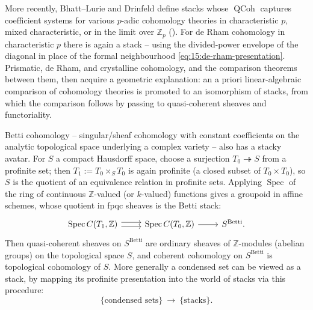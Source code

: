 \begin{remark}
\label{rmk:15:blf}
More recently, Bhatt--Lurie and Drinfeld define stacks whose $\operatorname{QCoh}$
captures coefficient systems for various $p$-adic cohomology theories in
characteristic $p$, mixed characteristic, or in the limit over $\mathbb{Z}_p$
(\cite{drinfeld2024prismatization,bhatt2022absoluteprismaticcohomology}). For de Rham
cohomology in characteristic $p$ there is again a stack -- using the divided-power
envelope of the diagonal in place of the formal neighbourhood
\eqref{eq:15:de-rham-presentation}. Prismatic, de Rham, and crystalline cohomology,
and the comparison theorems between them, then acquire a geometric explanation: an a
priori linear-algebraic comparison of cohomology theories is promoted to an
isomorphism of stacks, from which the comparison follows by passing to quasi-coherent
sheaves and functoriality.
\end{remark}

\begin{example}
\label{ex:15:betti}
Betti cohomology -- singular/sheaf cohomology with constant coefficients on the
analytic topological space underlying a complex variety -- also has a stacky
avatar. For $S$ a compact Hausdorff space, choose a surjection $T_0\twoheadrightarrow S$
from a profinite set; then $T_1 := T_0\times_S T_0$ is again profinite (a closed
subset of $T_0\times T_0$), so $S$ is the quotient of an equivalence relation in
profinite sets. Applying $\operatorname{Spec}$ of the ring of continuous
$\mathbb{Z}$-valued (or $k$-valued) functions gives a groupoid in affine schemes,
whose quotient in fpqc sheaves is the Betti stack:
\begin{equation}
\label{eq:15:betti-presentation}
\begin{tikzcd}
\operatorname{Spec} C(T_1,\mathbb{Z}) \arrow[r, shift left=0.6ex] \arrow[r, shift right=0.6ex] & \operatorname{Spec} C(T_0,\mathbb{Z}) \arrow[r] & S^{\mathrm{Betti}}.
\end{tikzcd}
\end{equation}
Then quasi-coherent sheaves on $S^{\mathrm{Betti}}$ are ordinary sheaves of
$\mathbb{Z}$-modules (abelian groups) on the topological space $S$, and coherent
cohomology on $S^{\mathrm{Betti}}$ is topological cohomology of $S$. More generally a
condensed set can be viewed as a stack, by mapping its profinite presentation into
the world of stacks via this procedure:
\begin{equation*}
\{\text{condensed sets}\}\ \longrightarrow\ \{\text{stacks}\}.
\end{equation*}
\end{example}

